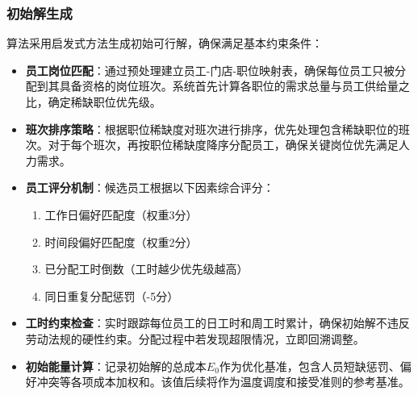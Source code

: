 \documentclass{ctexart}
\begin{document}
\subsubsection{初始解生成}
算法采用启发式方法生成初始可行解，确保满足基本约束条件：
\begin{itemize}
    \item \textbf{员工岗位匹配}：通过预处理建立员工-门店-职位映射表，确保每位员工只被分配到其具备资格的岗位班次。系统首先计算各职位的需求总量与员工供给量之比，确定稀缺职位优先级。
    
    \item \textbf{班次排序策略}：根据职位稀缺度对班次进行排序，优先处理包含稀缺职位的班次。对于每个班次，再按职位稀缺度降序分配员工，确保关键岗位优先满足人力需求。
    
    \item \textbf{员工评分机制}：候选员工根据以下因素综合评分：
    \begin{enumerate}
        \item 工作日偏好匹配度（权重3分）
        \item 时间段偏好匹配度（权重2分） 
        \item 已分配工时倒数（工时越少优先级越高）
        \item 同日重复分配惩罚（-5分）
    \end{enumerate}
    
    \item \textbf{工时约束检查}：实时跟踪每位员工的日工时和周工时累计，确保初始解不违反劳动法规的硬性约束。分配过程中若发现超限情况，立即回溯调整。
    
    \item \textbf{初始能量计算}：记录初始解的总成本$E_0$作为优化基准，包含人员短缺惩罚、偏好冲突等各项成本加权和。该值后续将作为温度调度和接受准则的参考基准。
\end{itemize}
\end{document}
